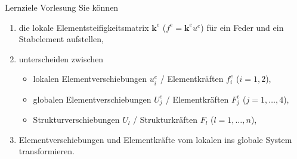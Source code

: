 \documentclass[aspectratio=169,professionalfonts]{beamer}
\begin{document}
\begin{frame}{Lernziele Vorlesung}
  \small
  Sie können
  \begin{enumerate}
    \item die lokale Elementsteifigkeitsmatrix $\mathbf{k}^e$ ($f^e=\mathbf{k}^eu^e$) für ein Feder und ein Stabelement aufstellen,
    \item unterscheiden zwischen
      \begin{itemize}
        \item lokalen Elementverschiebungen $u_i^e$ / Elementkräften $f_i^e$ ($i=1,2$),
        \item globalen Elementverschiebungen $U_j^e$ / Elementkräften $F_j^e$ ($j=1,\dots,4$),
        \item Strukturverschiebungen $U_l$ / Strukturkräften $F_l$ ($l=1,\dots,n$),
      \end{itemize}
    \item Elementverschiebungen und Elementkräfte vom lokalen ins globale System transformieren.
  \end{enumerate}
\end{frame}
\end{document}
